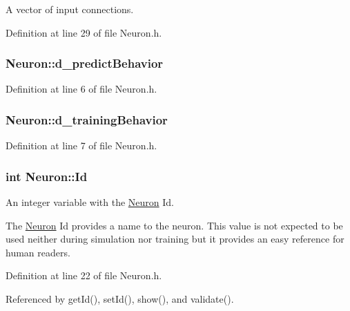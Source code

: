 A vector of input connections. 



Definition at line 29 of file Neuron.h.

\hypertarget{class_neuron_a6bdb3e83c3b897560dcd84a3ca0f0eb9}{
\subsubsection[{d\_\-predictBehavior}]{ {\bf Neuron::d\_\-predictBehavior}}}
\label{class_neuron_a6bdb3e83c3b897560dcd84a3ca0f0eb9}


Definition at line 6 of file Neuron.h.

\hypertarget{class_neuron_a0580299ae79817ffe24f5d0f9bd26a68}{
\subsubsection[{d\_\-trainingBehavior}]{ {\bf Neuron::d\_\-trainingBehavior}}}
\label{class_neuron_a0580299ae79817ffe24f5d0f9bd26a68}


Definition at line 7 of file Neuron.h.

\hypertarget{class_neuron_a72bb327a7c5c865e6748a4e074ce0680}{
\subsubsection[{Id}]{\setlength{\rightskip}{0pt plus 5cm}int {\bf Neuron::Id}}}
\label{class_neuron_a72bb327a7c5c865e6748a4e074ce0680}


An integer variable with the \hyperlink{class_neuron}{Neuron} Id. 

The \hyperlink{class_neuron}{Neuron} Id provides a name to the neuron. This value is not expected to be used neither during simulation nor training but it provides an easy reference for human readers. 

Definition at line 22 of file Neuron.h.



Referenced by getId(), setId(), show(), and validate().

